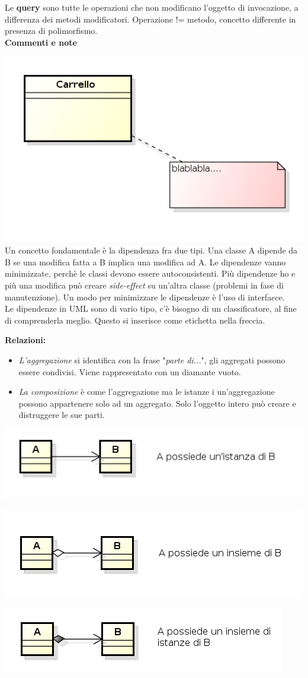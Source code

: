Le \textbf{query} sono tutte le operazioni che non modificano l'oggetto di invocazione, a differenza dei metodi modificatori. Operazione != metodo, concetto differente in presenza di polimorfismo.\\

\textbf{Commenti e note}

\includegraphics[width=0.5\columnwidth]{img9} %
\\
Un concetto fondamentale è la dipendenza fra due tipi. Una classe A dipende da B se una modifica fatta a B implica una modifica ad A. Le dipendenze vanno minimizzate, perchè le classi devono essere autoconsistenti. Più dipendenze ho e più una modifica può creare \textit{side-effect} su un'altra classe (problemi in fase di manutenzione). Un modo per minimizzare le dipendenze è l'uso di interfacce.\\
Le dipendenze in UML sono di vario tipo, c'è bisogno di un classificatore, al fine di comprenderla meglio. Questo si inserisce come etichetta nella freccia.\\

\pagebreak

\textbf{Relazioni:}
\begin{itemize}
	\item \textit{L'aggregazione} si identifica con la frase "\textit{parte di...}", gli aggregati possono essere condivisi. Viene rappresentato con un diamante vuoto.
	\item \textit{La composizione} è come l'aggregazione ma le istanze i un'aggregazione possono appartenere solo ad un aggregato. Solo l'oggetto intero può creare e distruggere le sue parti.
\end{itemize}


\begin{center}

\includegraphics[width=0.5\columnwidth]{img11} %

\includegraphics[width=0.5\columnwidth]{img12} %

\includegraphics[width=0.5\columnwidth]{img13} %

\end{center}

